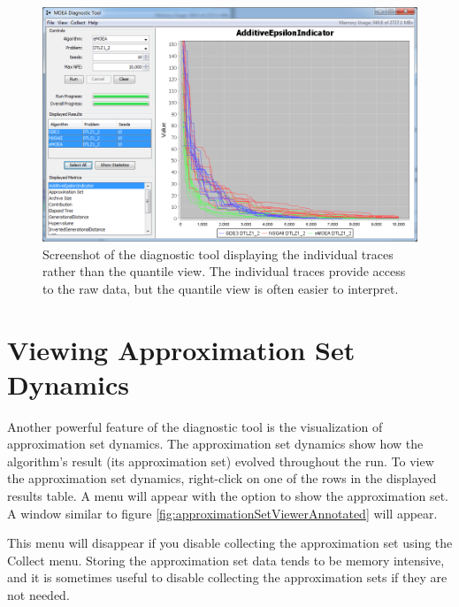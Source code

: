 \begin{figure}
  \includegraphics[width=\linewidth]{diagnosticToolTraces.png}
  \caption{Screenshot of the diagnostic tool displaying the individual traces rather than the quantile view.  The individual traces provide access to the raw data, but the quantile view is often easier to interpret.}
  \label{fig:diagnosticToolTraces}
\end{figure}

\section{Viewing Approximation Set Dynamics}
Another powerful feature of the diagnostic tool is the visualization of approximation set dynamics.  The approximation set dynamics show how the algorithm's result (its approximation set) evolved throughout the run.  To view the approximation set dynamics, right-click on one of the rows in the displayed results table.  A menu will appear with the option to show the approximation set.  A window similar to figure \ref{fig:approximationSetViewerAnnotated} will appear.

\begin{important}
  This menu will disappear if you disable collecting the approximation set using the Collect menu.  Storing the approximation set data tends to be memory intensive, and it is sometimes useful to disable collecting the approximation sets if they are not needed.
\end{important}

